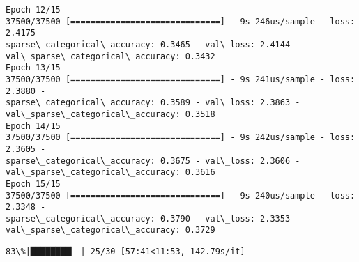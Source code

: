 \documentclass[11pt]{article}
\begin{document}
\begin{Verbatim}[commandchars=\\\{\}]
Epoch 12/15
37500/37500 [==============================] - 9s 246us/sample - loss: 2.4175 -
sparse\_categorical\_accuracy: 0.3465 - val\_loss: 2.4144 -
val\_sparse\_categorical\_accuracy: 0.3432
Epoch 13/15
37500/37500 [==============================] - 9s 241us/sample - loss: 2.3880 -
sparse\_categorical\_accuracy: 0.3589 - val\_loss: 2.3863 -
val\_sparse\_categorical\_accuracy: 0.3518
Epoch 14/15
37500/37500 [==============================] - 9s 242us/sample - loss: 2.3605 -
sparse\_categorical\_accuracy: 0.3675 - val\_loss: 2.3606 -
val\_sparse\_categorical\_accuracy: 0.3616
Epoch 15/15
37500/37500 [==============================] - 9s 240us/sample - loss: 2.3348 -
sparse\_categorical\_accuracy: 0.3790 - val\_loss: 2.3353 -
val\_sparse\_categorical\_accuracy: 0.3729
    \end{Verbatim}

    \begin{Verbatim}[commandchars=\\\{\}]
 83\%|████████▎ | 25/30 [57:41<11:53, 142.79s/it]
    \end{Verbatim}
\end{document}
